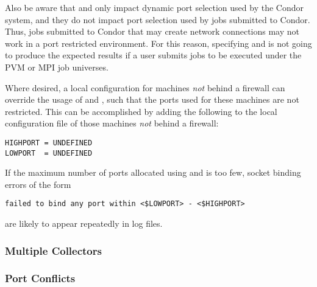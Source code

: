 Also be aware that  and 
only impact dynamic port selection used by the Condor system,
and they do not impact port selection used by jobs submitted to Condor.
Thus, jobs submitted to Condor that may create
network connections may not work in a port restricted environment.
For this reason, specifying  and 
is not going to produce the
expected results if a user submits jobs to be executed under
the PVM or MPI job universes.

Where desired, a local
configuration for machines \emph{not} behind a firewall
can override the usage of  and ,
such that the ports used for these machines are not restricted.
This can be accomplished by adding the following to the
local configuration file of those machines \emph{not}
behind a firewall:
\begin{verbatim}
HIGHPORT = UNDEFINED
LOWPORT  = UNDEFINED
\end{verbatim}


If the maximum number of ports allocated using 
 and 
is too few,
socket binding errors of the form
\footnotesize
\begin{verbatim}
failed to bind any port within <$LOWPORT> - <$HIGHPORT>
\end{verbatim}
\normalsize
are likely to appear repeatedly in log files.


\subsubsection{\label{sec:Ports-MultipleCollectors}Multiple Collectors}
\Todo


\subsubsection{\label{sec:Ports-Conflicts}Port Conflicts}
\Todo

